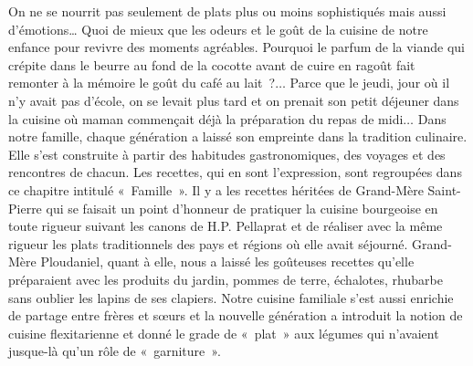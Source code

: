 On ne se nourrit pas seulement de plats plus ou moins sophistiqués mais aussi d'émotions… Quoi de mieux que les odeurs et le goût de la cuisine de notre enfance pour revivre des moments agréables. Pourquoi le parfum de la viande qui crépite dans le beurre au fond de la cocotte avant de cuire en ragoût fait remonter à la mémoire le goût du café au lait ?$\ldots$ Parce que le jeudi, jour où il n’y avait pas d’école, on se levait plus tard et on prenait son petit déjeuner dans la cuisine où maman commençait déjà la préparation du repas de midi$\ldots$
Dans notre famille, chaque génération a laissé son empreinte dans la tradition
culinaire. Elle s’est construite à partir des habitudes gastronomiques, des
voyages et des rencontres de chacun. Les recettes, qui en sont l’expression, sont
regroupées dans ce chapitre intitulé « Famille ». Il y a les recettes héritées de
Grand-Mère Saint-Pierre qui se faisait un point d’honneur de pratiquer la
cuisine bourgeoise en toute rigueur suivant les canons de H.P.
Pellaprat \cite{pellaprat} et de réaliser avec la même rigueur les plats traditionnels des pays et régions où elle avait séjourné. Grand-Mère Ploudaniel, quant à elle, nous a laissé les goûteuses recettes qu’elle préparaient avec les produits du jardin, pommes de terre, échalotes, rhubarbe sans oublier les lapins de ses clapiers. Notre cuisine familiale s’est aussi enrichie de partage entre frères et sœurs et la nouvelle génération a introduit la notion de cuisine flexitarienne et donné le grade de « plat » aux légumes qui n’avaient jusque-là qu’un rôle de « garniture ».
